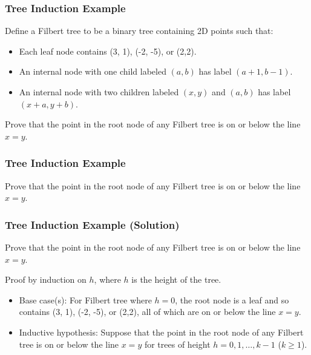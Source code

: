 \documentclass{beamer}
\newcommand{\blank}{\underbar{\hphantom{aaaaaaaa}}}
\begin{document}
\begin{frame}[t]
  \frametitle{Tree Induction Example}
  Define a Filbert tree to be a binary tree containing 2D points such that:
  \begin{itemize}
    \item Each leaf node contains (3, 1), (-2, -5), or (2,2).
    \item An internal node with one child labeled $(a, b)$ has label $(a+1, b-1)$.
    \item An internal node with two children labeled $(x, y)$ and $(a, b)$ has label $(x+a, y+b)$.

  \end{itemize}
  Prove that the point in the root node of any Filbert tree is on or below the line $x = y$.
\end{frame}

\begin{frame}[t]
  \frametitle{Tree Induction Example}
  Prove that the point in the root node of any Filbert tree is on or below the line $x = y$.
\end{frame}

  

\begin{frame}[t]
  \frametitle{Tree Induction Example (Solution)}
  Prove that the point in the root node of any Filbert tree is on or below the line $x = y$.
  
  Proof by induction on $h$, where $h$ is the height of the tree.
  \begin{itemize}
    \item Base case(s): For Filbert tree where $h=0$, the root node is a leaf and so contains (3, 1), (-2, -5), or (2,2), all of which are on or below the line $x=y$. \\
    \item Inductive hypothesis: Suppose that the point in the root node of any Filbert tree is on or below the line $x = y$ for trees of height $h = 0, 1, \ldots, k-1$ ($k \geq 1$). 
  \end{itemize}
\end{frame}
\end{document}
